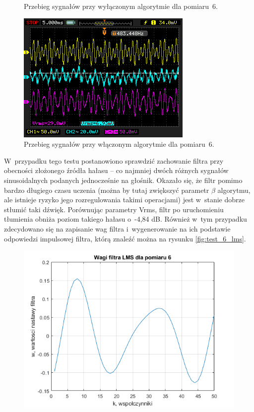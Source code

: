 \begin{enumerate}
\begin{figure}[h!]
		\caption{Przebieg sygnałów przy wyłączonym algorytmie dla pomiaru~6.}
		\label{fig:test_6_off}
	\end{figure}	
	\begin{figure}[h!]
		\centering
		\includegraphics[scale=0.7]{../Assets/Results/6_complex_on.png}
		\caption{Przebieg sygnałów przy włączonym algorytmie dla pomiaru~6.}
		\label{fig:test_6_on}
	\end{figure}
	W~przypadku tego testu postanowiono sprawdzić zachowanie filtra przy obecności złożonego źródła hałasu -- co najmniej dwóch różnych sygnałów sinusoidalnych podanych jednocześnie na głośnik. Okazało się, że filtr pomimo bardzo długiego czasu uczenia (można by tutaj zwiększyć parametr $\beta$ algorytmu, ale istnieje ryzyko jego rozregulowania takimi operacjami) jest w~stanie dobrze stłumić taki dźwięk. Porównując parametry Vrms, filtr po uruchomieniu tłumienia obniża poziom takiego hałasu o~-4,84 dB. Również w~tym przypadku zdecydowano się na zapisanie wag filtra i~wygenerowanie na ich podstawie odpowiedzi impulsowej filtra, którą znaleźć można na rysunku \ref{fig:test_6_lms}.
	\begin{figure}[h!]
		\centering
		\includegraphics[scale=0.8]{../Assets/Results/6_wagi_lms.png}

\end{figure}
\end{enumerate}
